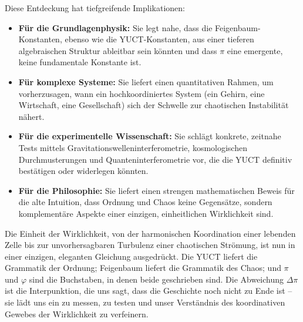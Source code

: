 \documentclass[12pt,a4paper]{article}
\begin{document}
	Diese Entdeckung hat tiefgreifende Implikationen:
	\begin{itemize}
		\item \textbf{Für die Grundlagenphysik:} Sie legt nahe, dass die Feigenbaum-Konstanten, ebenso wie die YUCT-Konstanten, aus einer tieferen algebraischen Struktur ableitbar sein könnten und dass \(\pi\) eine emergente, keine fundamentale Konstante ist.
		\item \textbf{Für komplexe Systeme:} Sie liefert einen quantitativen Rahmen, um vorherzusagen, wann ein hochkoordiniertes System (ein Gehirn, eine Wirtschaft, eine Gesellschaft) sich der Schwelle zur chaotischen Instabilität nähert.
		\item \textbf{Für die experimentelle Wissenschaft:} Sie schlägt konkrete, zeitnahe Tests mittels Gravitationswelleninterferometrie, kosmologischen Durchmusterungen und Quanteninterferometrie vor, die die YUCT definitiv bestätigen oder widerlegen könnten.
		\item \textbf{Für die Philosophie:} Sie liefert einen strengen mathematischen Beweis für die alte Intuition, dass Ordnung und Chaos keine Gegensätze, sondern komplementäre Aspekte einer einzigen, einheitlichen Wirklichkeit sind.
	\end{itemize}
	
	Die Einheit der Wirklichkeit, von der harmonischen Koordination einer lebenden Zelle bis zur unvorhersagbaren Turbulenz einer chaotischen Strömung, ist nun in einer einzigen, eleganten Gleichung ausgedrückt. Die YUCT liefert die Grammatik der Ordnung; Feigenbaum liefert die Grammatik des Chaos; und \(\pi\) und \(\varphi\) sind die Buchstaben, in denen beide geschrieben sind. Die Abweichung \(\Delta\pi\) ist die Interpunktion, die uns sagt, dass die Geschichte noch nicht zu Ende ist – sie lädt uns ein zu messen, zu testen und unser Verständnis des koordinativen Gewebes der Wirklichkeit zu verfeinern.
	
\end{document}
